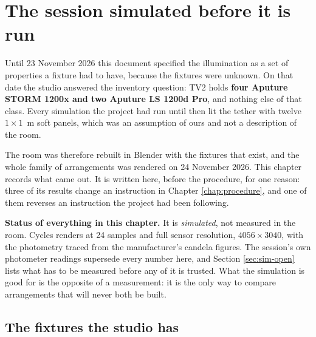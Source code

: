 \chapter{The session simulated before it is run}
\label{chap:simulation}

Until 23 November 2026 this document specified the illumination as a set of
properties a fixture had to have, because the fixtures were unknown. On that
date the studio answered the inventory question: TV2 holds \textbf{four
Aputure STORM 1200x and two Aputure LS 1200d Pro}, and nothing else of that
class. Every simulation the project had run until then lit the tether with
twelve $1 \times 1$~m soft panels, which was an assumption of ours and not a
description of the room.

The room was therefore rebuilt in Blender with the fixtures that exist, and
the whole family of arrangements was rendered on 24 November 2026. This
chapter records what came out. It is written here, before the procedure, for
one reason: three of its results change an instruction in Chapter
\ref{chap:procedure}, and one of them reverses an instruction the project had
been following.

\textbf{Status of everything in this chapter.} It is \emph{simulated}, not
measured in the room. Cycles renders at 24 samples and full sensor
resolution, $4056 \times 3040$, with the photometry traced from the
manufacturer's candela figures. The session's own photometer readings
supersede every number here, and Section \ref{sec:sim-open} lists what has to
be measured before any of it is trusted. What the simulation is good for is
the opposite of a measurement: it is the only way to compare arrangements
that will never both be built.

\section{The fixtures the studio has}

